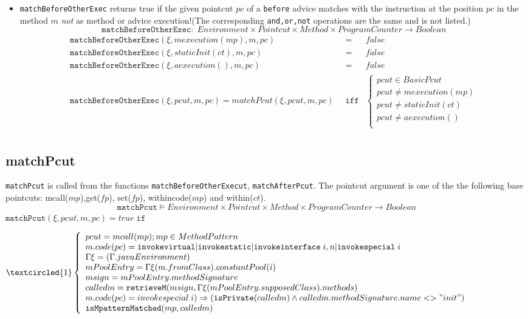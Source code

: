 \begin{itemize}
  \item
\texttt{matchBeforeOtherExec} returns true if the given pointcut $pc$ of a \texttt{before} advice matches with the instruction at the position $pc$ in the method $m$ \emph{not} as method or advice execution!(The corresponding \texttt{and,or,not} operations are the same and is not listed.)
$$\texttt{matchBeforeOtherExec}:\;Environment\times Pointcut\times Method\times ProgramCounter\rightarrow Boolean$$
\begin{eqnarray*}
  \texttt{matchBeforeOtherExec}(\xi,mexecution(mp),m,pc)&=&false\\
  \texttt{matchBeforeOtherExec}(\xi,staticInit(ct),m,pc)&=&false\\
  \texttt{matchBeforeOtherExec}(\xi,aexecution(),m,pc)&=&false\\
  \texttt{matchBeforeOtherExec}(\xi,pcut,m,pc)=matchPcut(\xi,pcut,m,pc)\;\;&\texttt{iff}&\left\{
  \begin{aligned}
    pcut\in BasicPcut\\
    pcut\neq mexecution(mp)\\
    pcut\neq staticInit(ct)\\
    pcut\neq aexecution()\\
  \end{aligned}\right.\\
\end{eqnarray*}

\end{itemize}

\subsection{matchPcut}
\texttt{matchPcut} is called from the functions \texttt{matchBeforeOtherExecut}, \texttt{matchAfterPcut}. The pointcut argument is one of the the following base pointcuts: mcall($mp$),get($fp$), set($fp$), withincode($mp$) and within($ct$).
$$\texttt{matchPcut}\models Environment\times Pointcut\times Method\times ProgramCounter\rightarrow Boolean$$
\quad\quad\quad$\texttt{matchPcut}(\xi,pcut,m,pc)=true\;\texttt{if}$

$\textcircled{1}\left\{\begin{array}{l}
pcut=mcall(mp);mp\in MethodPattern\\
m.code(pc)=\texttt{invokevirtual}|\texttt{invokestatic}|\texttt{invokeinterface}\;i,n|\texttt{invokespecial}\;i\\
\Gamma\xi=(\Gamma .javaEnvironment)\\
mPoolEntry=\Gamma\xi(m.fromClass).constantPool(i)\\
msign=mPoolEntry.methodSignature\\
calledm=\texttt{retrieveM}(msign,\Gamma\xi(mPoolEntry.supposedClass).methods)\\
m.code(pc)=invokespecial\;i)\Rightarrow(\texttt{isPrivate}(calledm)\wedge calledm.methodSignature.name<>"init")\\
\texttt{isMpatternMatched}(mp,calledm)\\
\end{array}\right.$

